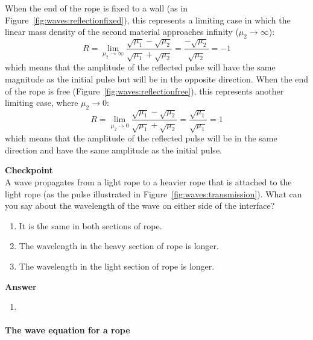 When the end of the rope is fixed to a wall (as in Figure~\ref{fig:waves:reflectionfixed}), this represents a limiting case in which the linear mass density of the second material approaches infinity ($\mu_2 \rightarrow \infty$):
\begin{equation}
R=\lim_{\mu_2\to \infty}\frac{\sqrt{\mu_1}-\sqrt{\mu_2}}{\sqrt{\mu_1}+\sqrt{\mu_2}}=\frac{-\sqrt{\mu_2}}{\sqrt{\mu_2}}=-1
\end{equation}
which means that the amplitude of the reflected pulse will have the same magnitude as the initial pulse but will be in the opposite direction. When the end of the rope is free (Figure~\ref{fig:waves:reflectionfree}), this represents another limiting case, where $\mu_2\rightarrow 0$:
\begin{equation}
R=\lim_{\mu_2\to 0}\frac{\sqrt{\mu_1}-\sqrt{\mu_2}}{\sqrt{\mu_1}+\sqrt{\mu_2}}=\frac{\sqrt{\mu_1}}{\sqrt{\mu_1}}=1
\end{equation}
which means that the amplitude of the reflected pulse will be in the same direction  and have the same amplitude as the initial pulse.

\begin{framed}
\textbf{Checkpoint}\\
A wave propagates from a light rope to a heavier rope that is attached to the light rope (as the pulse illustrated in Figure~\ref{fig:waves:transmission}). What can you say about the wavelength of the wave on either side of the interface?

\begin{enumerate}
\item It is the same in both sections of rope.
\item The wavelength in the heavy section of rope is longer.
\item The wavelength in the light section of rope is longer.
\end{enumerate}

\begin{framed}
\textbf{Answer}\\
\begin{enumerate}[resume]
\item
\end{enumerate}
\end{framed}
\end{framed}

\paragraph{The wave equation for a rope}


